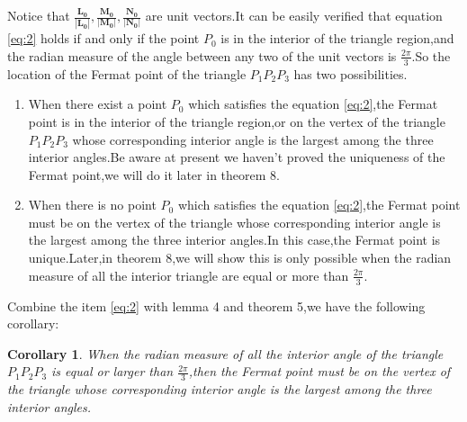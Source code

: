\documentclass{amsart}
\theoremstyle{plain}
\newtheorem{corollary}[theorem]{Corollary}
\theoremstyle{definition}
\begin{document}
Notice that 
$\frac{\mathbf{L_0}}{|\mathbf{L_0}|},\frac{\mathbf{M_0}}{|\mathbf{M_0}|},\frac{\mathbf{N_0}}{|\mathbf{N_0}|}$
are unit vectors.It can be easily verified that equation
\eqref{eq:2} holds if and only if the point $P_0$ is in the interior of the
triangle region,and the radian measure of the angle between any
two of the unit vectors is $\frac{2\pi}{3}$.So the location of the Fermat point of the
triangle $P_1P_2P_3$ has two possibilities.
\begin{enumerate}
\item \label{item:1}When there
exist a point $P_0$ which satisfies the equation \eqref{eq:2},the Fermat point is in the interior
of the triangle region,or on the vertex of the triangle
$P_1P_2P_3$ whose corresponding interior angle is the
largest among the three interior angles.Be aware at present we haven't
proved the uniqueness of the Fermat point,we will do it later in theorem
8.

\item \label{item:2}When there is no point $P_0$ which satisfies
the equation \eqref{eq:2},the Fermat point must be on the vertex of
the triangle whose corresponding interior angle is the largest among
the three interior angles.In this case,the Fermat point is
unique.Later,in theorem 8,we will show this is only possible when the
radian measure of all the interior triangle are equal or more than $\frac{2\pi}{3}$.
\end{enumerate}

Combine the item \eqref{eq:2} with lemma 4 and theorem 5,we have the following corollary:
\begin{corollary}
When the radian measure of all the interior angle of the triangle $P_1P_2P_3$
is equal or larger than $\frac{2\pi}{3}$,then the Fermat point must be on the vertex of
the triangle whose corresponding interior angle is the largest among
the three interior angles.
\end{corollary}
\end{document}
